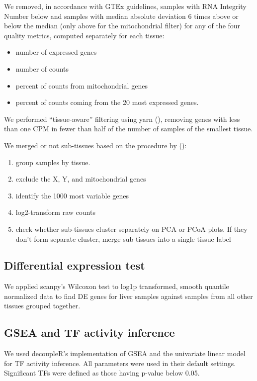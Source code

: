 \documentclass{article}
\begin{document}
We removed, in accordance with GTEx guidelines, samples with RNA Integrity Number below and samples with median absolute deviation 6 times above or below the median (only above for the mitochondrial filter) for any of the four quality metrics, computed separately for each tissue: 
\begin{itemize}
  \item number of expressed genes
  \item number of counts
  \item percent of counts from mitochondrial genes
  \item percent of counts coming from the 20 most expressed genes. 
\end{itemize}

We performed “tissue-aware” filtering using yarn (\cite{Paulson2017-jv}), removing genes with less than one CPM in fewer than half of the number of samples of the smallest tissue. 

We merged or not sub-tissues based on the procedure by (\cite{Paulson2017-jv}): 
\begin{enumerate}
  \item group samples by tissue. 
  \item exclude the X, Y, and mitochondrial genes
  \item identify the 1000 most variable genes
  \item log2-transform raw counts
  \item check whether sub-tissues cluster separately on PCA or PCoA plots. If they don't form separate cluster, merge sub-tissues into a single tissue label
\end{enumerate}

\subsection{Differential expression test}
We applied scanpy's Wilcoxon test to log1p transformed, smooth quantile normalized data to find DE genes for liver samples against samples from all other tissues grouped together. 

\subsection{GSEA and TF activity inference}
We used decoupleR's implementation of GSEA and the univariate linear model for TF activity inference. All parameters were used in their default settings. Significant TFs were defined as those having p-value below 0.05.
\end{document}
